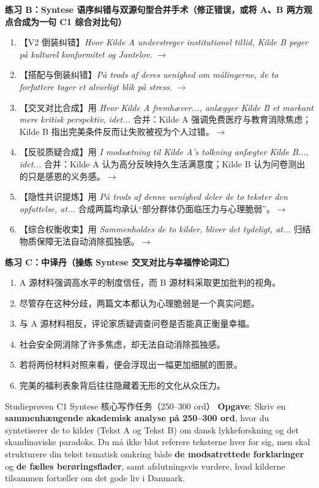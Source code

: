 \textbf{练习 B：Syntese 语序纠错与双源句型合并手术（修正错误，或将 A、B 两方观点合成为一句 C1 综合对比句）}
\begin{enumerate}
  \item 【V2 倒装纠错】\textit{Hvor Kilde A understreger institutionel tillid, Kilde B peger på kulturel konformitet og Jantelov.} $\rightarrow$
  \item 【搭配与倒装纠错】\textit{På trods af deres uenighed om målingerne, de to forfattere tager et alvorligt blik på stress.} $\rightarrow$
  \item 【交叉对比合成】用 \textit{Hvor Kilde A fremhæver..., anlægger Kilde B et markant mere kritisk perspektiv, idet...} 合并：Kilde A 强调免费医疗与教育消除焦虑；Kilde B 指出完美条件反而让失败被视为个人过错。$\rightarrow$
  \item 【反驳质疑合成】用 \textit{I modsætning til Kilde A's tolkning anfægter Kilde B..., idet...} 合并：Kilde A 认为高分反映持久生活满意度；Kilde B 认为问卷测出的只是感恩的义务感。$\rightarrow$
  \item 【隐性共识提炼】用 \textit{På trods af denne uenighed deler de to tekster den opfattelse, at...} 合成两篇均承认“部分群体仍面临压力与心理脆弱”。$\rightarrow$
  \item 【综合权衡收束】用 \textit{Sammenholdes de to kilder, bliver det tydeligt, at...} 归结物质保障无法自动消除孤独感。$\rightarrow$
\end{enumerate}

\textbf{练习 C：中译丹（操练 Syntese 交叉对比与幸福悖论词汇）}
\begin{enumerate}
  \item A 源材料强调高水平的制度信任，而 B 源材料采取更加批判的视角。
  \item 尽管存在这种分歧，两篇文本都认为心理脆弱是一个真实问题。
  \item 与 A 源材料相反，评论家质疑调查问卷是否能真正衡量幸福。
  \item 社会安全网消除了许多焦虑，却无法自动消除孤独感。
  \item 若将两份材料对照来看，便会浮现出一幅更加细腻的图景。
  \item 完美的福利表象背后往往隐藏着无形的文化从众压力。
\end{enumerate}


\begin{emailbox}{Studieprøven C1 Syntese 核心写作任务（250--300 ord）}
\textbf{Opgave}: Skriv en \textbf{sammenhængende akademisk analyse på 250--300 ord}, hvor du syntetiserer de to kilder (Tekst A og Tekst B) om dansk lykkeforskning og det skandinaviske paradoks. Du må ikke blot referere teksterne hver for sig, men skal strukturere din tekst tematisk omkring både \textbf{de modsatrettede forklaringer} og \textbf{de fælles berøringsflader}, samt afslutningsvis vurdere, hvad kilderne tilsammen fortæller om det gode liv i Danmark.
\end{emailbox}

